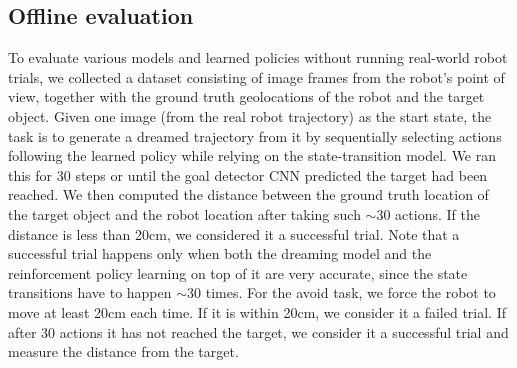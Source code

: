 \documentclass[letterpaper, 10 pt, conference]{ieeeconf}
\newcommand{\mryoo}[1]{\fxnote{\hl{Michael: #1}}}
\begin{document}

\subsection{Offline evaluation}
To evaluate various models and learned policies without running real-world robot trials, we collected a dataset consisting of image frames from the robot's point of view, together with the ground truth geolocations of the robot and the target object.
Given one image (from the real robot trajectory) as the start state, the task is to generate a dreamed trajectory from it by sequentially selecting actions following the learned policy while relying on the state-transition model.
We ran this for 30 steps or until the goal detector CNN predicted the target had been reached. We then computed the distance between the ground truth location of the target object and the robot location after taking such $\sim30$ actions. If the distance is less than 20cm, we considered it a successful trial. Note that a successful trial happens only when both the dreaming model and the reinforcement policy learning on top of it are very accurate, since the state transitions have to happen $\sim30$ times. For the avoid task, we force the robot to move at least 20cm each time. If it is within 20cm, we consider it a failed trial. If after 30 actions it has not reached the target, we consider it a successful trial and measure the distance from the target.



\end{document}
